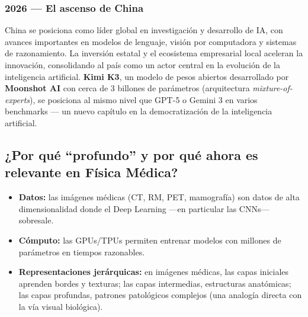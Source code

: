 \documentclass[
  letterpaper,
  DIV=11,
  numbers=noendperiod]{scrartcl}
\providecommand{\tightlist}{%
  \setlength{\itemsep}{0pt}\setlength{\parskip}{0pt}}
\begin{document}
\subsubsection{2026 --- El ascenso de China}\label{el-ascenso-de-china}

China se posiciona como líder global en investigación y desarrollo de
IA, con avances importantes en modelos de lenguaje, visión por
computadora y sistemas de razonamiento. La inversión estatal y el
ecosistema empresarial local aceleran la innovación, consolidando al
país como un actor central en la evolución de la inteligencia
artificial. \textbf{Kimi K3}, un modelo de pesos abiertos desarrollado
por \textbf{Moonshot AI} con cerca de 3 billones de parámetros
(arquitectura \emph{mixture-of-experts}), se posiciona al mismo nivel
que GPT-5 o Gemini 3 en varios benchmarks --- un nuevo capítulo en la
democratización de la inteligencia artificial.

\subsection{¿Por qué ``profundo'' y por qué ahora es relevante en Física
Médica?}\label{por-quuxe9-profundo-y-por-quuxe9-ahora-es-relevante-en-fuxedsica-muxe9dica}

\begin{itemize}
\tightlist
\item
  \textbf{Datos:} las imágenes médicas (CT, RM, PET, mamografía) son
  datos de alta dimensionalidad donde el Deep Learning ---en particular
  las CNNs--- sobresale.
\item
  \textbf{Cómputo:} las GPUs/TPUs permiten entrenar modelos con millones
  de parámetros en tiempos razonables.
\item
  \textbf{Representaciones jerárquicas:} en imágenes médicas, las capas
  iniciales aprenden bordes y texturas; las capas intermedias,
  estructuras anatómicas; las capas profundas, patrones patológicos
  complejos (una analogía directa con la vía visual biológica).
\end{itemize}
\end{document}
